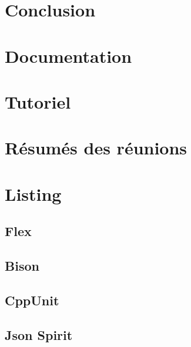 \documentclass[a4paper,11pt]{report}
\newcommand{\+}{\discretionary{\mbox{\scriptsize$\hookleftarrow$}}{}{}}
\begin{document}
\chapter{Conclusion}


\listoffigures
\listoftables
\lstlistoflistings

\appendix

\chapter{Documentation}




\chapter{Tutoriel}



\chapter{Résumés des réunions}











\chapter{Listing}
\section{Flex}
\label{lexer}

\section{Bison}
\label{parser}

\section{CppUnit}
\label{TestAgent}
\section{Json Spirit}
\label{json}





\end{document}
